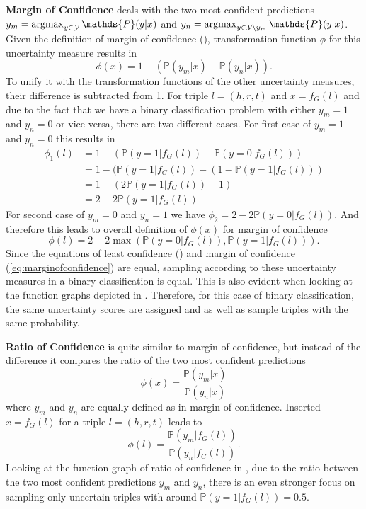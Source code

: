 \textbf{Margin of Confidence}
deals with the two most confident predictions $y_m = \argmax_{y \in \mathcal{Y}} \mathds{P}(y | x)$ and $y_n = \argmax_{y \in \mathcal{Y} \setminus y_m}{\mathds{P}(y | x)}$.
Given the definition of margin of confidence (), transformation function $\phi$ for this uncertainty measure results in
\begin{equation}
    \phi(x) = 1 - (\mathds{P}(y_m |x) - \mathds{P}(y_n | x)).
\end{equation}
To unify it with the transformation functions of the other uncertainty measures, their difference is subtracted from 1.
For triple $l = (h,r,t)$ and $x = f_G(l)$ and due to the fact that we have a binary classification problem with either $y_m = 1$ and $y_n = 0$ or vice versa, there are two different cases.
For first case of $y_m = 1$ and $y_n = 0$ this results in
\begin{equation}
\begin{split}
\phi_1(l) 
&= 1 - (\mathds{P}(y = 1 |f_G(l)) - \mathds{P}(y = 0 | f_G(l))) \\
&= 1 - (\mathds{P}(y = 1 |f_G(l)) -  (1 - \mathds{P}(y = 1 | f_G(l))) \\
&= 1 - (2 \mathds{P}(y = 1 |f_G(l)) - 1) \\
&= 2 - 2 \mathds{P}(y = 1 |f_G(l))
\end{split}
\end{equation}
For second case of $y_m = 0$ and $y_n = 1$ we have  $\phi_2 = 2 - 2 \mathds{P}(y = 0 |f_G(l))$. 
And therefore this leads to overall definition of $\phi(x)$ for margin of confidence
\begin{equation} \label{eq:marginofconfidence}
    \phi(l) = 2 - 2 \max(\mathds{P}(y = 0 |f_G(l)), \mathds{P}(y = 1 |f_G(l))).
\end{equation}
Since the equations of least confidence () and margin of confidence (\ref{eq:marginofconfidence}) are equal, sampling according to these uncertainty measures in a binary classification is equal.
This is also evident when looking at the function graphs depicted in .
Therefore, for this case of binary classification, the same uncertainty scores are assigned and \usmax as well as \ussoftmax sample triples with the same probability.

\textbf{Ratio of Confidence}
is quite similar to margin of confidence, but instead of the difference it compares the ratio of the two most confident predictions
\begin{equation}
    \phi(x) = \frac{\mathds{P}(y_m | x)}{\mathds{P}(y_n |x)}
\end{equation}
where $y_m$ and $y_n$ are equally defined as in margin of confidence.
Inserted $x = f_G(l)$ for a triple $l = (h,r,t)$ leads to
\begin{equation}
    \phi(l) = \frac{\mathds{P}(y_m |  f_G(l))}{\mathds{P}(y_n |f_G(l))}.
\end{equation}
Looking at the function graph of ratio of confidence in , due to the ratio between the two most confident predictions $y_m$ and $y_n$, there is an even stronger focus on sampling only uncertain triples with \ussoftmax around $\mathds{P}(y = 1 | f_G(l)) = 0.5$.